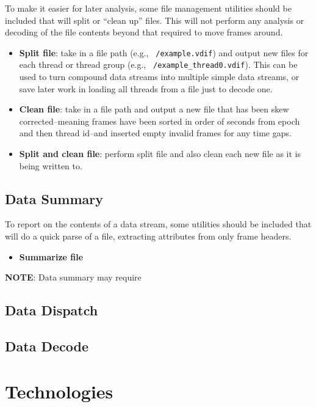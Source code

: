 \documentclass[11pt]{article}
\begin{document}
To make it easier for later analysis, some file management utilities should be included that will split or ``clean up'' files. This will not perform any analysis or decoding of the file contents beyond that required to move frames around.

\begin{itemize}
	\item \textbf{Split file}: take in a file path (e.g., \texttt{~/example.vdif}) and output new files for each thread or thread group (e.g., \texttt{~/example\_thread0.vdif}). This can be used to turn compound data streams into multiple simple data streams, or save later work in loading all threads from a file just to decode one.
	\item \textbf{Clean file}: take in a file path and output a new file that has been skew corrected--meaning frames have been sorted in order of seconds from epoch and then thread id--and inserted empty invalid frames for any time gaps.
	\item \textbf{Split and clean file}: perform split file and also clean each new file as it is being written to.
\end{itemize}

\subsection{Data Summary}

To report on the contents of a data stream, some utilities should be included that will do a quick parse of a file, extracting attributes from only frame headers.

\begin{itemize}
	\item \textbf{Summarize file}	
\end{itemize}

\begin{mdframed}[hidealllines=true,backgroundcolor=blue!20]
	\textbf{NOTE}: Data summary may require
\end{mdframed}


\subsection{Data Dispatch}

\subsection{Data Decode}

\section{Technologies}
\end{document}
